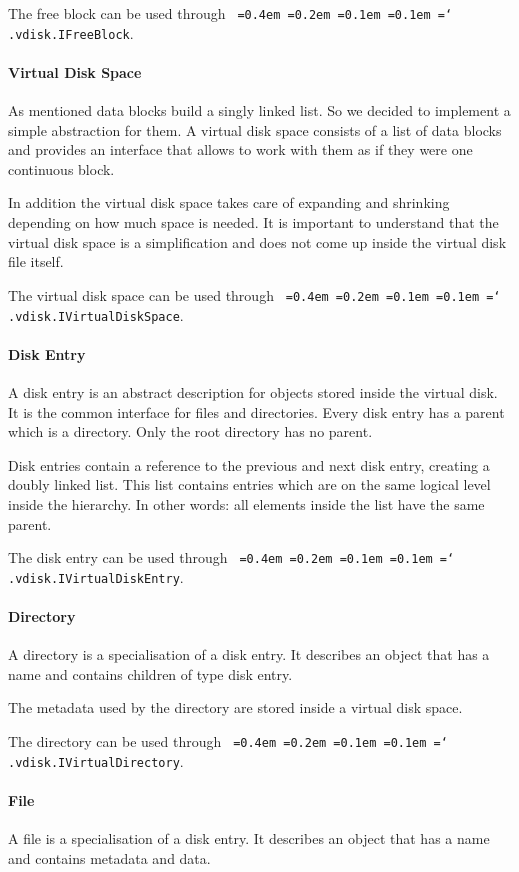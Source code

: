 \documentclass[a4paper,12pt]{article}
\newcommand*\justify{%
  \fontdimen2\font=0.4em%
  \fontdimen3\font=0.2em%
  \fontdimen4\font=0.1em%
  \fontdimen7\font=0.1em%
  \hyphenchar\font=`\-%
}
\newcommand{\package}[1]{\texttt{\justify #1}}
\begin{document}
The free block can be used through \package{.vdisk.IFreeBlock}.

\paragraph{Virtual Disk Space}
As mentioned data blocks build a singly linked list. So we decided to implement a simple abstraction for them. A virtual disk space consists of a list of data blocks and provides an interface that allows to work with them as if they were one continuous block.

In addition the virtual disk space takes care of expanding and shrinking depending on how much space is needed. It is important to understand that the virtual disk space is a simplification and does not come up inside the virtual disk file itself.

The virtual disk space can be used through \package{.vdisk.IVirtualDiskSpace}.

\paragraph{Disk Entry}
A disk entry is an abstract description for objects stored inside the virtual disk. It is the common interface for files and directories. Every disk entry has a parent which is a directory. Only the root directory has no parent.

Disk entries contain a reference to the previous and next disk entry, creating a doubly linked list. This list contains entries which are on the same logical level inside the hierarchy. In other words: all elements inside the list have the same parent.

The disk entry can be used through \package{.vdisk.IVirtualDiskEntry}.

\paragraph{Directory}
A directory is a specialisation of a disk entry. It describes an object that has a name and contains children of type disk entry.

The metadata used by the directory are stored inside a virtual disk space.

The directory can be used through \package{.vdisk.IVirtualDirectory}.

\paragraph{File}
A file is a specialisation of a disk entry. It describes an object that has a name and contains metadata and data.
\end{document}
